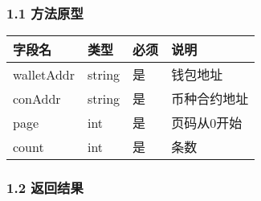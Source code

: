 \documentclass[letterpaper,10pt,english]{sphinxmanual}
\begin{document}
\subsubsection{1.1 方法原型}
\label{\detokenize{BCBWalletSDK_u63a5_u53e3_u8bf4_u660e:id76}}



\begin{savenotes}\sphinxattablestart
\centering
\begin{tabulary}{\linewidth}[t]{|T|T|T|T|}
\hline
\sphinxstyletheadfamily 
字段名
&\sphinxstyletheadfamily 
类型
&\sphinxstyletheadfamily 
必须
&\sphinxstyletheadfamily 
说明
\\
\hline
walletAddr
&
string
&
是
&
钱包地址
\\
\hline
conAddr
&
string
&
是
&
币种合约地址
\\
\hline
page
&
int
&
是
&
页码从0开始
\\
\hline
count
&
int
&
是
&
条数
\\
\hline
\end{tabulary}
\par
\sphinxattableend\end{savenotes}


\subsubsection{1.2 返回结果}
\label{\detokenize{BCBWalletSDK_u63a5_u53e3_u8bf4_u660e:id77}}
\end{document}
